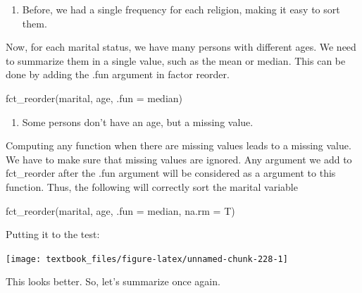 \documentclass[]{tufte-book}
\newenvironment{Shaded}{}{}
\newcommand{\DataTypeTok}[1]{\textcolor[rgb]{0.56,0.13,0.00}{#1}}
\newcommand{\KeywordTok}[1]{\textcolor[rgb]{0.00,0.44,0.13}{\textbf{#1}}}
\newcommand{\NormalTok}[1]{#1}
\newcommand{\OperatorTok}[1]{\textcolor[rgb]{0.40,0.40,0.40}{#1}}
\newcommand{\StringTok}[1]{\textcolor[rgb]{0.25,0.44,0.63}{#1}}
\providecommand{\tightlist}{%
  \setlength{\itemsep}{0pt}\setlength{\parskip}{0pt}}
\begin{document}
\begin{enumerate}
\def\labelenumi{\arabic{enumi}.}
\tightlist
\item
  Before, we had a single frequency for each religion, making it easy to sort them.
\end{enumerate}

Now, for each marital status, we have many persons with different ages. We need to summarize them in a single value, such as the mean or median. This can be done by adding the .fun argument in factor reorder.

fct\_reorder(marital, age, .fun = median)

\begin{enumerate}
\def\labelenumi{\arabic{enumi}.}
\setcounter{enumi}{1}
\tightlist
\item
  Some persons don't have an age, but a missing value.
\end{enumerate}

Computing any function when there are missing values leads to a missing value. We have to make sure that missing values are ignored. Any argument we add to fct\_reorder after the .fun argument will be considered as a argument to this function. Thus, the following will correctly sort the marital variable

fct\_reorder(marital, age, .fun = median, na.rm = T)

Putting it to the test:

\begin{Shaded}
\end{Shaded}

\texttt{[image: textbook\_files/figure-latex/unnamed-chunk-228-1]}

This looks better. So, let's summarize once again.
\end{document}
